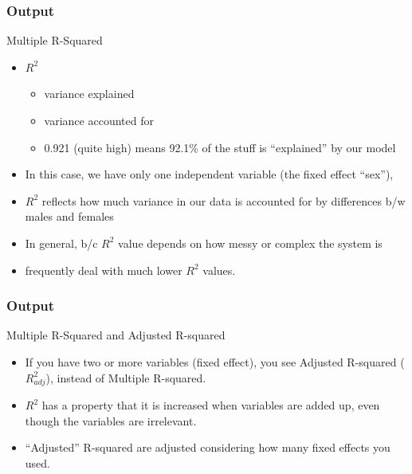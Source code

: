 \documentclass{beamer}\usepackage[]{graphicx}\usepackage[]{color}
\begin{document}
\begin{frame}
\frametitle{Output}
Multiple R-Squared
\begin{itemize}
\item $R^2$ 
	\begin{itemize}
	\item variance explained
	\item variance accounted for
	\item 0.921 (quite high) means 92.1\% of the stuff is ``explained'' by our model
	\end{itemize}
\item In this case, we have only one independent variable (the fixed effect ``sex''),
\item $R^2$ reflects how much variance in our data is accounted for by \alert{differences b/w males and females}
\item In general, b/c $R^2$ value depends on how messy or complex the system is
\item frequently deal with much lower $R^2$ values. 
\end{itemize}
\end{frame}


\begin{frame}
\frametitle{Output}
Multiple R-Squared and Adjusted R-squared
\begin{itemize}
\item If you have two or more variables (fixed effect), you see Adjusted R-squared ($R^2_{adj}$), instead of Multiple R-squared.
\item $R^2$ has a property that it is increased when variables are added up, even though the variables are irrelevant.
\item ``Adjusted'' R-squared are adjusted considering how many fixed effects you used.
\end{itemize}
\end{frame}
\end{document}
